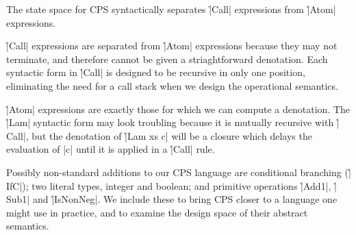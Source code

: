 The state space for CPS syntactically separates \h|Call| expressions from \h|Atom|
expressions.
%


\h|Call| expressions are separated from \h|Atom| expressions because they may
not terminate, and therefore cannot be given a striaghtforward denotation.
%
Each syntactic form in \h|Call| is designed to be recursive in only one position,
eliminating the need for a call stack when we design the operational semantics.


\h|Atom| expressions are exactly those for which we can compute a denotation.
%
The \h|Lam| syntactic form may look troubling because it is mutually recursive
with \h|Call|, but the denotation of \h|Lam xs c| will be a closure which delays
the evaluation of \p|c| until it is applied in a \h|Call| rule.


Possibly non-standard additions to our CPS language are conditional branching
(\h|IfC|); two literal types, integer and boolean; and primitive operations
\h|Add1|, \h|Sub1| and \h|IsNonNeg|.
%
We include these to bring CPS closer to a language one might use in practice,
and to examine the design space of their abstract semantics.


